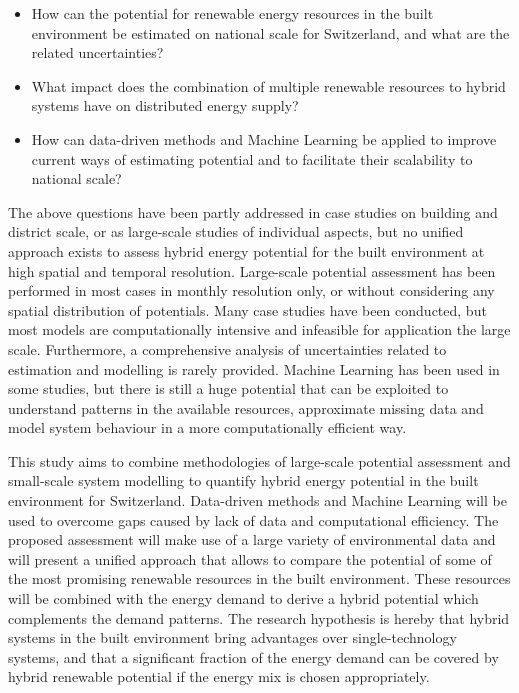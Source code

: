 \begin{itemize}
\item How can the potential for renewable energy resources in the built environment be estimated on national scale for Switzerland, and what are the related uncertainties?
\item What impact does the combination of multiple renewable resources to hybrid systems have on distributed energy supply?
\item How can data-driven methods and Machine Learning be applied to improve current ways of estimating potential and to facilitate their scalability to national scale?
\end{itemize}

The above questions have been partly addressed in case studies on building and district scale, or as large-scale studies of individual aspects, but no unified approach exists to assess hybrid energy potential for the built environment at high spatial and temporal resolution. Large-scale potential assessment has been performed in most cases in monthly resolution only, or without considering any spatial distribution of potentials. Many case studies have been conducted, but most models are computationally intensive and infeasible for application the large scale. Furthermore, a comprehensive analysis of uncertainties related to estimation and modelling is rarely provided. Machine Learning has been used in some studies, but there is still a huge potential that can be exploited to understand patterns in the available resources, approximate missing data and model system behaviour in a more computationally efficient way.

This study aims to combine methodologies of large-scale potential assessment and small-scale system modelling to quantify hybrid energy potential in the built environment for Switzerland. Data-driven methods and Machine Learning will be used to overcome gaps caused by lack of data and computational efficiency. The proposed assessment will make use of a large variety of environmental data and will present a unified approach that allows to compare the potential of some of the most promising renewable resources in the built environment. These resources will be combined with the energy demand to derive a hybrid potential which complements the demand patterns. The research hypothesis is hereby that hybrid systems in the built environment bring advantages over single-technology systems, and that a significant fraction of the energy demand can be covered by hybrid renewable potential if the energy mix is chosen appropriately.

